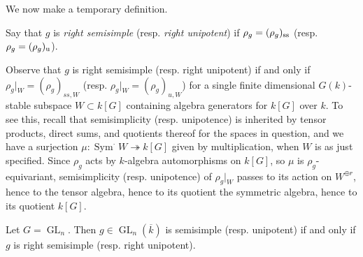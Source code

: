 \documentclass[10pt]{article}
\newcommand{\GL}{\operatorname{GL}}
\renewcommand{\(}{\left(}
\renewcommand{\)}{\right)}
\renewcommand{\bar}{\overline}
\DeclareMathOperator{\Sym}{Sym}
\newcommand{\onto}{\twoheadrightarrow }
\numberwithin{thm}{subsection}
\begin{document}
We now make a temporary definition.
\begin{defn}Say that $g$ is \textit{right semisimple}
(resp. \textit{right unipotent})
if $\rho_g=(\rho_g)_{\rm{ss}}$ (resp. $\rho_g=(\rho_g)_{\rm{u}}$).
\end{defn}
\begin{rem}Observe that $g$ is right semisimple (resp. right unipotent)
if and only if $\rho_g|_W=(\rho_{g})_{ss,W}$ (resp.
$\rho_g|_W=(\rho_g)_{u,W}$)
for a single finite dimensional $G(k)$-stable
subspace $W\subset k[G]$ containing
algebra generators for $k[G]$ over $k$.
To see this, recall that semisimplicity (resp. unipotence)
is inherited by tensor products, direct sums, and quotients thereof for 
the spaces in question,
and we have a surjection
$\mu:\Sym^\cdot W\onto k[G]$ given by multiplication, 
when $W$ is as just specified.
Since $\rho_g$ acts by $k$-algebra automorphisms
on $k[G]$, so $\mu$ is $\rho_g$-equivariant, 
semisimplicity (resp. unipotence)
of $\rho_g|_W$ passes
to its action on $W^{\oplus r}$,
hence to the tensor algebra,
hence to its quotient the symmetric algebra,
hence to its quotient $k[G]$.
\end{rem}
\begin{prop}Let $G=\GL_n$.
Then $g\in \GL_n(\bar k)$ is semisimple (resp. unipotent)
if and only if $g$ is right semisimple (resp. right unipotent).
\end{prop}
\end{document}
